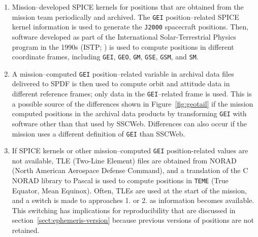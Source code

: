 \documentclass[draft]{agujournal2019}
\begin{document}
\begin{enumerate}
    \parskip 0.1in 

    \item Mission--developed SPICE kernels for positions that are obtained from the mission team periodically and archived. The \texttt{GEI} position--related SPICE kernel information is used to generate the \texttt{J2000} spacecraft positions. Then, software developed as part of the International Solar-Terrestrial Physics program in the 1990s (ISTP; ) is used to compute positions in different coordinate frames, including \texttt{GEI}, \texttt{GEO}, \texttt{GM}, \texttt{GSE}, \texttt{GSM}, and \texttt{SM}. 

    \item A mission--computed \texttt{GEI} position--related variable in archival data files delivered to SPDF is then used to compute orbit and attitude data in different reference frames; only data in the \texttt{GEI}--related frame is used. This is a possible source of the differences shown in Figure~\ref{fig:geotail} if the mission computed positions in the archival data products by transforming \texttt{GEI} with software other than that used by SSCWeb. Differences can also occur if the mission uses a different definition of \texttt{GEI} than SSCWeb.

    \item If SPICE kernels or other mission--computed  \texttt{GEI} position-related values are not available, TLE (Two-Line Element) files are obtained from NORAD (North American Aerospace Defense Command), and a translation of the C NORAD library to Pascal \cite{NORADSGP4c} is used to compute positions in \texttt{TEME} (True Equator, Mean Equinox). Often, TLEs are used at the start of the mission, and a switch is made to approaches 1. or 2. as information becomes available. This switching has implications for reproducibility that are discussed in section~\ref{sect:ephemeris-version} because previous versions of positions are not retained.
     

\end{enumerate}
\end{document}
